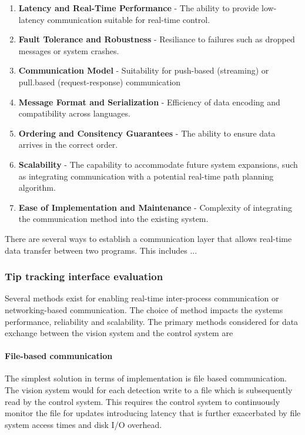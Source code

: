 \begin{enumerate}
    \item \textbf{Latency and Real-Time Performance} - The ability to provide low-latency communication suitable for real-time control.
    \item \textbf{Fault Tolerance and Robustness} - Resiliance to failures such as dropped messages or system crashes.
    \item \textbf{Communication Model} - Suitability for push-based (streaming) or pull.based (request-response) communication
    \item \textbf{Message Format and Serialization} - Efficiency of data encoding and compatibility across languages.
    \item \textbf{Ordering and Consitency Guarantees} - The ability to ensure data arrives in the correct order.
    \item \textbf{Scalability} - The capability to accommodate future system expansions, such as integrating communication with a potential real-time path planning algorithm.
    \item \textbf{Ease of Implementation and Maintenance} - Complexity of integrating the communication method into the existing system.
\end{enumerate}

There are several ways to establish a communication layer that allows real-time data transfer between two programs. This includes ...


\subsubsection{Tip tracking interface evaluation}
Several methods exist for enabling real-time inter-process communication or networking-based communication. The choice of method impacts the systems performance, reliability and scalability. The primary methods considered for data exchange between the vision system and the control system are

\paragraph*{File-based communication}
The simplest solution in terms of implementation is file based communication. The vision system would for each detection write to a file which is subsequently read by the control system. This requires the control system to continuously monitor the file for updates introducing latency that is further exacerbated by file system access times and disk I/O overhead. 

